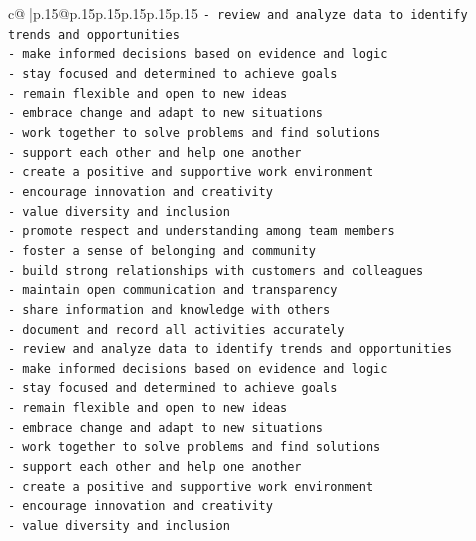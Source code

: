 \documentclass{article}
\begin{document}
{\begin{supertabular}{c@{$\;$}|p{.15\linewidth}@{}p{.15\linewidth}p{.15\linewidth}p{.15\linewidth}p{.15\linewidth}p{.15\linewidth}}
{{{\texttt{{-} review and analyze data to identify trends and opportunities} \\
\texttt{{-} make informed decisions based on evidence and logic} \\
\texttt{{-} stay focused and determined to achieve goals} \\
\texttt{{-} remain flexible and open to new ideas} \\
\texttt{{-} embrace change and adapt to new situations} \\
\texttt{{-} work together to solve problems and find solutions} \\
\texttt{{-} support each other and help one another} \\
\texttt{{-} create a positive and supportive work environment} \\
\texttt{{-} encourage innovation and creativity} \\
\texttt{{-} value diversity and inclusion} \\
\texttt{{-} promote respect and understanding among team members} \\
\texttt{{-} foster a sense of belonging and community} \\
\texttt{{-} build strong relationships with customers and colleagues} \\
\texttt{{-} maintain open communication and transparency} \\
\texttt{{-} share information and knowledge with others} \\
\texttt{{-} document and record all activities accurately} \\
\texttt{{-} review and analyze data to identify trends and opportunities} \\
\texttt{{-} make informed decisions based on evidence and logic} \\
\texttt{{-} stay focused and determined to achieve goals} \\
\texttt{{-} remain flexible and open to new ideas} \\
\texttt{{-} embrace change and adapt to new situations} \\
\texttt{{-} work together to solve problems and find solutions} \\
\texttt{{-} support each other and help one another} \\
\texttt{{-} create a positive and supportive work environment} \\
\texttt{{-} encourage innovation and creativity} \\
\texttt{{-} value diversity and inclusion} \\
}}}
\end{supertabular}}
\end{document}
